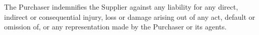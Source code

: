 \documentclass[nz-terms]{subfiles}
\begin{document}
The Purchaser indemnifies the Supplier against any liability for any direct,
indirect or consequential injury, loss or damage arising out of any act, default
or omission of, or any representation made by the Purchaser or its agents.
\end{document}
